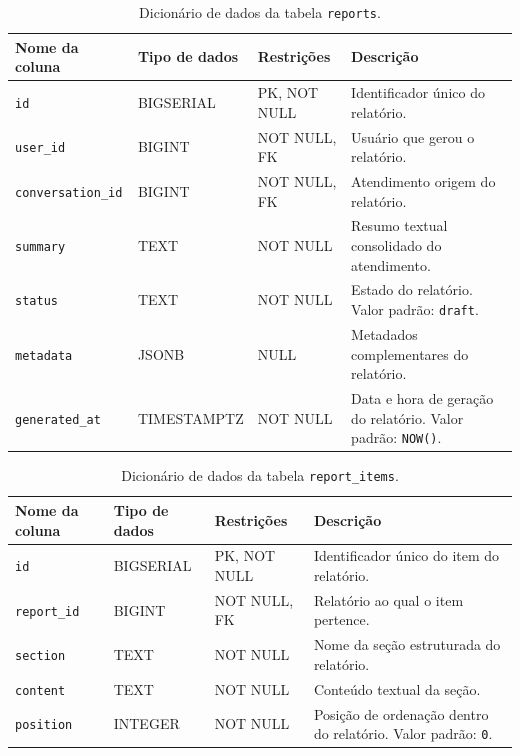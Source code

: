 \begin{apendicesenv}
\begin{table}[htb]
\centering
\small
\caption{Dicionário de dados da tabela \texttt{reports}.}
\label{tab:dd-reports}
\begin{tabularx}{\textwidth}{p{3.2cm}p{2.8cm}p{3.1cm}X}
\hline
Nome da coluna & Tipo de dados & Restrições & Descrição \\
\hline
\texttt{id} & BIGSERIAL & PK, NOT NULL & Identificador único do relatório. \\
\texttt{user\_id} & BIGINT & NOT NULL, FK & Usuário que gerou o relatório. \\
\texttt{conversation\_id} & BIGINT & NOT NULL, FK & Atendimento origem do relatório. \\
\texttt{summary} & TEXT & NOT NULL & Resumo textual consolidado do atendimento. \\
\texttt{status} & TEXT & NOT NULL & Estado do relatório. Valor padrão: \texttt{draft}. \\
\texttt{metadata} & JSONB & NULL & Metadados complementares do relatório. \\
\texttt{generated\_at} & TIMESTAMPTZ & NOT NULL & Data e hora de geração do relatório. Valor padrão: \texttt{NOW()}. \\
\hline
\end{tabularx}
\end{table}

\begin{table}[htb]
\centering
\small
\caption{Dicionário de dados da tabela \texttt{report\_items}.}
\label{tab:dd-report-items}
\begin{tabularx}{\textwidth}{p{3.2cm}p{2.8cm}p{3.1cm}X}
\hline
Nome da coluna & Tipo de dados & Restrições & Descrição \\
\hline
\texttt{id} & BIGSERIAL & PK, NOT NULL & Identificador único do item do relatório. \\
\texttt{report\_id} & BIGINT & NOT NULL, FK & Relatório ao qual o item pertence. \\
\texttt{section} & TEXT & NOT NULL & Nome da seção estruturada do relatório. \\
\texttt{content} & TEXT & NOT NULL & Conteúdo textual da seção. \\
\texttt{position} & INTEGER & NOT NULL & Posição de ordenação dentro do relatório. Valor padrão: \texttt{0}. \\
\hline
\end{tabularx}
\end{table}


\end{apendicesenv}
